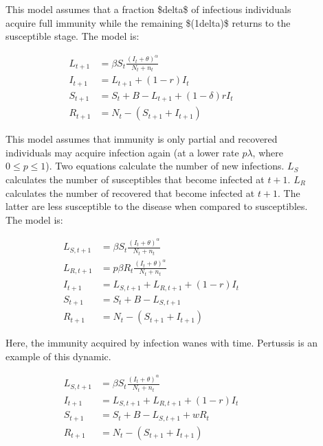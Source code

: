 \documentclass[letterpaper,10pt,english]{sphinxmanual}
\begin{document}
\ignorespaces \begin{description}
\item[{}] \leavevmode
This model assumes that a fraction \$delta\$ of infectious individuals acquire full immunity while the remaining \$(1\sphinxhyphen{}delta)\$ returns to the susceptible stage. The model is:

\end{description}
\label{equation:intromodels:E:SIpRpSmodel}\begin{align}
        L_{t+1} &= \beta S_t \frac{(I_t+\theta)^\alpha} {N_t+n_t}\nonumber \\
        I_{t+1} &= L_{t+1} + (1-r)I_t\nonumber\\
        S_{t+1} &= S_t + B - L_{t+1} + (1-\delta) r I_t\nonumber\\
        R_{t+1} &= N_t-(S_{t+1}+I_{t+1})\nonumber
\end{align}\begin{description}
\item[{}] \leavevmode
This model assumes that immunity is only partial and recovered individuals may acquire infection again (at a  lower rate \(p \lambda\), where \(0\leq p \leq 1\)). Two equations calculate the number of new infections. \(L_S\)  calculates the number of susceptibles that become infected at \(t+1\). \(L_R\)  calculates the number of recovered that become infected at \(t+1\). The latter are less susceptible to the disease when compared to susceptibles. The model is:

\end{description}
\label{equation:intromodels:E:SIpRmodel}\begin{align}
    L_{S,t+1} &= \beta S_t \frac{(I_t+\theta)^\alpha} {N_t+n_t}\nonumber \\
    L_{R,t+1} &= p \beta R_t \frac{(I_t+\theta)^\alpha} {N_t+n_t}\nonumber\\
    I_{t+1} &= L_{S,t+1} + L_{R,t+1} + (1-r)I_t\nonumber\\
    S_{t+1} &= S_t + B - L_{S,t+1} \nonumber\\
    R_{t+1} &= N_t-(S_{t+1}+I_{t+1}) \nonumber
    \end{align}
\ignorespaces \begin{description}
\item[{}] \leavevmode
Here, the immunity acquired by infection wanes with time. Pertussis is an example of this dynamic.

\end{description}
\label{equation:intromodels:E:SIRSmodel}\begin{align} \label{}
        L_{S,t+1} &= \beta S_t \frac{(I_t+\theta)^\alpha} {N_t+n_t}\nonumber \\
    I_{t+1} &= L_{S,t+1} + L_{R,t+1} + (1-r)I_t\nonumber\\
        S_{t+1} &= S_t + B - L_{S,t+1} + w R_t\nonumber\\
        R_{t+1} &= N_t-(S_{t+1}+I_{t+1}) \nonumber
\end{align}
\end{document}

